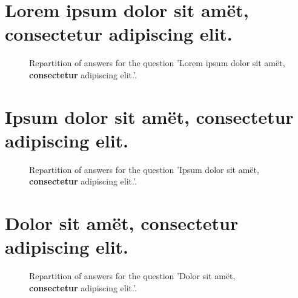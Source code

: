 \documentclass[12pt]{article}
\date{April 26, 2018}
\begin{document}
\clearpage{}
\section{Lorem ipsum dolor sit amët, \textbf{ consectetur } adipiscing elit.}

\label{sec:1}


\begin{figure}[h!]
    \caption{\label{figure:q1-1}Repartition of answers for the question 'Lorem ipsum dolor sit amët, \textbf{ consectetur } adipiscing elit.'.}
\end{figure}



\clearpage{}
\section{Ipsum dolor sit amët, \textbf{ consectetur }  adipiscing elit.}

\label{sec:2}


\begin{figure}[h!]
    \caption{\label{figure:q2-1}Repartition of answers for the question 'Ipsum dolor sit amët, \textbf{ consectetur }  adipiscing elit.'.}
\end{figure}



\clearpage{}
\section{Dolor sit amët, \textbf{ consectetur}  adipiscing elit.}

\label{sec:3}


\begin{figure}[h!]
    \caption{\label{figure:q3-1}Repartition of answers for the question 'Dolor sit amët, \textbf{ consectetur}  adipiscing elit.'.}
\end{figure}
\end{document}
